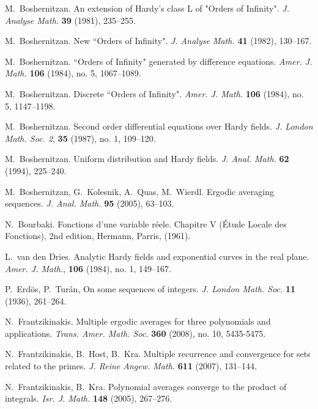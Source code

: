 \documentclass[11pt]{amsart}
\theoremstyle{plain}
\theoremstyle{definition}
\theoremstyle{remark}
\begin{document}
\begin{thebibliography}{9999}
 M.~Boshernitzan. An extension of Hardy's class L
  of "Orders of Infinity".  {\em J. Analyse Math.} \textbf{39}
  (1981), 235--255.

 M.~Boshernitzan. New ``Orders of Infinity".  {\em
    J. Analyse Math.} \textbf{41} (1982), 130--167.

 M.~Boshernitzan.  ``Orders of Infinity" generated
  by difference equations.  {\em Amer. J. Math.} \textbf{106}
  (1984), no. 5,  1067--1089.

 M.~Boshernitzan.  Discrete ``Orders of Infinity".
  {\em Amer. J. Math.} \textbf{106} (1984), no. 5,  1147--1198.


 M.~Boshernitzan. Second order differential
  equations over Hardy fields.  {\em J. London Math. Soc. 2},
  \textbf{35} (1987), no. 1, 109--120.

 M.~Boshernitzan. Uniform distribution and Hardy
  fields.  {\em J. Anal. Math.} \textbf{62} (1994), 225--240.


 M.~Boshernitzan, G.~Kolesnik, A.~Quas,
  M.~Wierdl.  Ergodic averaging sequences.  {\it J. Anal. Math.}
  \textbf{95} (2005), 63--103.

 N.~Bourbaki. Fonctions d'une variable r\'eele.
  Chapitre V (\'Etude Locale des Fonctions), 2nd edition, Hermann,
  Parris, (1961).

 L.~van den Dries. Analytic Hardy fields and
  exponential curves in the real plane.  {\em Amer. J. Math.},
  \textbf{106}  (1984), no. 1,  149--167.


 P.~Erd\"os, P.~Tur\'an, On some sequences of
  integers. {\em J. London Math. Soc.} \textbf{11} (1936), 261--264.


 N.~Frantzikinakis.  Multiple ergodic averages for
  three polynomials and applications.   {\it Trans. Amer.
    Math. Soc.}  \textbf{360} (2008), no. 10, 5435-5475.




 N.~Frantzikinakis, B.~Host, B.~Kra.  Multiple
  recurrence and convergence for sets related to the primes. {\em J.
    Reine Angew. Math.} \textbf{611} (2007), 131--144.

 N.~Frantzikinakis, B.~Kra.  Polynomial averages
  converge to the product of integrals. {\em Isr. J. Math.}
  \textbf{148} (2005), 267--276.




\end{thebibliography}
\end{document}

